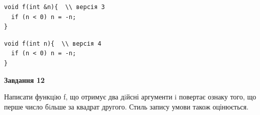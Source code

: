 \documentclass[12pt, ukrainian]{article}
\begin{document}
{\begin {large}
\begin{minipage}[t]{11.0cm}
\vspace{-8mm}\begin{verbatim}
void f(int &n){  \\ версія 3
  if (n < 0) n = -n;
}
\end{verbatim}

\vspace{-8mm}\begin{verbatim}
void f(int n){  \\ версія 4
  if (n < 0) n = -n;
}
\end{verbatim}



\begin{center}
\textbf{Завдання 12}
\end{center}

Написати функцiю f, що отримує два дiйсні аргументи i повертає ознаку того, що перше число бiльше за квадрат другого. Стиль запису умови також оцінюється.\par

\end{minipage}

\end {large}}
\newpage
\end{document}
